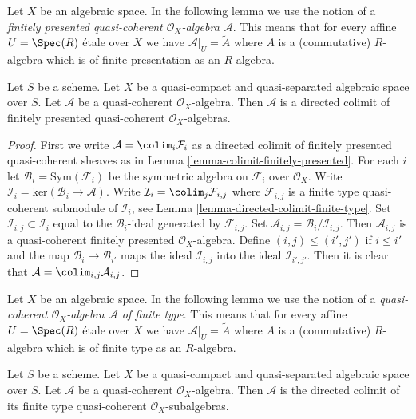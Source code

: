 \noindent
Let $X$ be an algebraic space. In the following lemma we use the notion
of a {\it finitely presented quasi-coherent $\mathcal{O}_X$-algebra
$\mathcal{A}$}. This means that for every affine
$U = \Spec(R)$ \'etale over $X$ we have $\mathcal{A}|_U = \widetilde{A}$
where $A$ is a (commutative) $R$-algebra which is of finite presentation
as an $R$-algebra.

\begin{lemma}
\label{lemma-algebra-directed-colimit-finite-presentation}
Let $S$ be a scheme. Let $X$ be a quasi-compact and quasi-separated
algebraic space over $S$.
Let $\mathcal{A}$ be a quasi-coherent $\mathcal{O}_X$-algebra.
Then $\mathcal{A}$ is a directed colimit of finitely presented
quasi-coherent $\mathcal{O}_X$-algebras.
\end{lemma}

\begin{proof}
First we write $\mathcal{A} = \colim_i \mathcal{F}_i$ as a directed
colimit of finitely presented quasi-coherent sheaves as in
Lemma \ref{lemma-colimit-finitely-presented}.
For each $i$ let $\mathcal{B}_i = \text{Sym}(\mathcal{F}_i)$ be the
symmetric algebra on $\mathcal{F}_i$ over $\mathcal{O}_X$. Write
$\mathcal{I}_i = \text{ker}(\mathcal{B}_i \to \mathcal{A})$. Write
$\mathcal{I}_i = \colim_j \mathcal{F}_{i, j}$ where
$\mathcal{F}_{i, j}$ is a finite type quasi-coherent submodule of
$\mathcal{I}_i$, see
Lemma \ref{lemma-directed-colimit-finite-type}.
Set $\mathcal{I}_{i, j} \subset \mathcal{I}_i$
equal to the $\mathcal{B}_i$-ideal generated by $\mathcal{F}_{i, j}$.
Set $\mathcal{A}_{i, j} = \mathcal{B}_i/\mathcal{I}_{i, j}$.
Then $\mathcal{A}_{i, j}$ is a quasi-coherent finitely presented
$\mathcal{O}_X$-algebra. Define $(i, j) \leq (i', j')$ if
$i \leq i'$ and the map $\mathcal{B}_i \to \mathcal{B}_{i'}$
maps the ideal $\mathcal{I}_{i, j}$ into the ideal $\mathcal{I}_{i', j'}$.
Then it is clear that $\mathcal{A} = \colim_{i, j} \mathcal{A}_{i, j}$.
\end{proof}

\noindent
Let $X$ be an algebraic space. In the following lemma we use the notion
of a {\it quasi-coherent $\mathcal{O}_X$-algebra $\mathcal{A}$
of finite type}. This means that for every affine
$U = \Spec(R)$ \'etale over $X$ we have $\mathcal{A}|_U = \widetilde{A}$
where $A$ is a (commutative) $R$-algebra which is of finite type
as an $R$-algebra.

\begin{lemma}
\label{lemma-algebra-directed-colimit-finite-type}
Let $S$ be a scheme. Let $X$ be a quasi-compact and quasi-separated algebraic
space over $S$. Let $\mathcal{A}$ be a quasi-coherent $\mathcal{O}_X$-algebra.
Then $\mathcal{A}$ is the directed colimit of its finite type
quasi-coherent $\mathcal{O}_X$-subalgebras.
\end{lemma}


